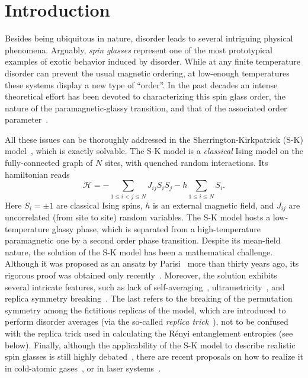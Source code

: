 \documentclass[twocolumn,superscriptaddress,prb,10pt]{revtex4-1}
\begin{document}
\maketitle


\section{Introduction}


Besides being ubiquitous in nature, disorder leads to several intriguing 
physical phenomena. 
Arguably, \emph{spin glasses} represent one of the most prototypical examples
of exotic behavior induced by disorder.
While at any finite temperature disorder can prevent the 
usual magnetic ordering, at low-enough temperatures these systems display a 
new type of ``order''. In the past decades an intense theoretical 
effort has been devoted to characterizing this spin glass order, the nature of 
the paramagnetic-glassy transition, and that of the associated order 
parameter~\cite{binder-1986,parisi-book,young-1998,nishimori-book,castellani-2005}. 

All these issues can be thoroughly addressed in the Sherrington-Kirkpatrick 
(S-K) model~\cite{sherrington-1978,sherrington-1978-prl}, which is exactly 
solvable. The S-K model is a \emph{classical} Ising model on the fully-connected 
graph of $N$ sites, with quenched random interactions. Its hamiltonian reads  
%
\begin{equation}
{\mathcal H}=-\sum\limits_{1\le i<j\le N}J_{ij}S_i S_j-
h\sum\limits_{1\le i\le N}S_i.
\label{SK-intro}
\end{equation}
%
Here $S_i=\pm 1$ are classical Ising spins, $h$ is an external magnetic field, and 
$J_{ij}$ are uncorrelated (from site to site) random variables. The S-K model hosts 
a low-temperature glassy phase, which is separated from a high-temperature paramagnetic 
one by a second order phase transition. Despite its mean-field nature, the solution 
of the S-K model has been a mathematical challenge. Although it was proposed as an 
ansatz by Parisi~\cite{parisi-1980} more than thirty years ago, its rigorous proof 
was obtained only recently~\cite{talagrand-2006}. Moreover, the solution exhibits several 
intricate features, such as lack of self-averaging~\cite{pastur-1991}, ultrametricity~\cite{
mezard-1984,rammal-1986}, and replica symmetry breaking~\cite{parisi-book,castellani-2005}. 
The last refers to the breaking of the permutation symmetry among the fictitious replicas 
of the model, which are introduced to perform disorder averages (via the so-called 
\emph{replica trick}~\cite{cardy-book}), not to be confused with the replica trick used 
in calculating the R\'enyi entanglement entropies (see below). Finally, although the 
applicability of the S-K model to describe realistic spin glasses is still highly 
debated~\cite{yucesoy-2012,billoire-2012,yucesoy-2013}, there are recent proposals on 
how to realize it in cold-atomic gases~\cite{morrison-2008,rotondo-2015}, or in laser 
systems~\cite{ghofraniha-2015}. 
\end{document}
